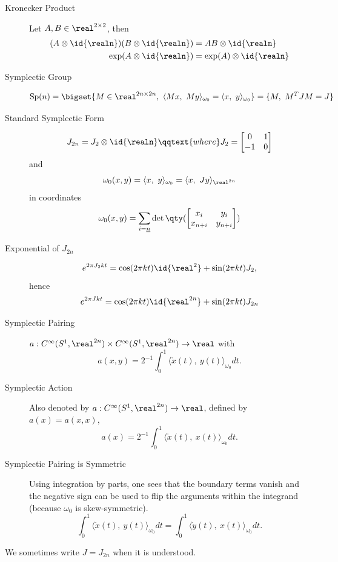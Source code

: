\documentclass[../main-v2-manifolds.tex]{subfiles}
\begin{document}
\begin{description}
    \item[Kronecker Product]
    Let $A, B\in\real^{2\times 2}$, then
    \begin{align*}
        (A\otimes\id{\realn})(B\otimes\id{\realn}) &= AB\otimes\id{\realn}\\
        \exp(A\otimes\id{\realn}) &= \exp(A)\otimes\id{\realn}        
    \end{align*}
    \item[Symplectic Group]
    \[
    \operatorname{Sp}(n) = \bigset{M\in\real^{2n\times 2n},\ \langle Mx,\ My\rangle_{\omega_0} = \langle x,\ y\rangle_{\omega_0}}=\{M,\ M^TJM = J\}
    \]
    \item[Standard Symplectic Form]
    \[
    J_{2n} = J_2\otimes \id{\realn}\qqtext{where}J_2 = \symatrix 
    \]
    and
    \[
        \omega_0(x,y) = \langle x,\ y\rangle_{\omega_0} = \langle x,\ Jy\rangle_{\realtn}
    \]
    in coordinates
    \[
        \omega_0(x,y) = \sum_{i=\underline{n}}\det\qty(\begin{bmatrix}
            x_i & y_i \\
            x_{n+i} & y_{n+i}
        \end{bmatrix})
    \]
    \item[Exponential of $J_{2n}$]
    \[
        e^{2\pi J_2 kt}=\cos(2\pi kt)\id{\real^2} + \sin(2\pi kt)J_2,
    \]
    hence
    \[
        e^{2\pi Jkt} = \cos(2\pi kt)\id{\realtn} + \sin(2\pi kt)J_{2n}
    \]
    \item[Symplectic Pairing]
    $a: C^\infty(S^1,\realtn)\times C^\infty(S^1,\realtn)\to\real$ with 
    \[a(x,y) = 2^{-1}\int_0^1 \langle\mathring{x}(t),\ y(t)\rangle_{\omega_0}dt.\]
    \item[Symplectic Action]
    Also denoted by $a: C^\infty(S^1,\realtn)\to\real$, defined by $a(x) = a(x,x)$,
    \[
        a(x) = 2^{-1}\int_0^1\langle \mathring{x}(t),\ x(t)\rangle_{\omega_0}dt.
    \]
    \item[Symplectic Pairing is Symmetric] 
    Using integration by parts, one sees that the boundary terms vanish and the negative sign can be used to flip the arguments within the integrand (because $\omega_0$ is skew-symmetric).
    \[
        \int_0^1\langle\mathring{x}(t),\ y(t)\rangle_{\omega_0}dt = \int_0^1\langle\mathring{y}(t),\ x(t)\rangle_{\omega_0}dt.
    \]
\end{description}
\begin{remark}[$J = J_{2n}$]
        We sometimes write $J = J_{2n}$ when it is understood.
    \end{remark}
\end{document}
